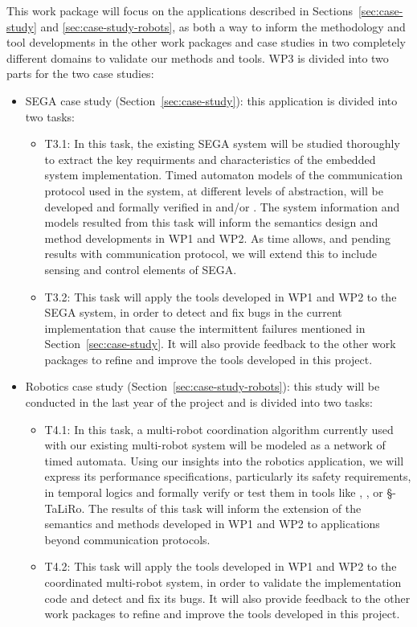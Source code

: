 This work package will focus on the applications described in Sections~\ref{sec:case-study} and \ref{sec:case-study-robots}, as both a way to inform the methodology and tool developments in the other work packages and case studies in two completely different domains to validate our methods and tools.
WP3 is divided into two parts for the two case studies:
\begin{itemize}[labelsep=3pt,leftmargin=12pt]
\item SEGA case study (Section~\ref{sec:case-study}): this application is divided into two tasks:
  \begin{itemize}
  \item T3.1: In this task, the existing SEGA system will be
    studied thoroughly to extract the key requirments and
    characteristics of the embedded system implementation.  Timed
    automaton models of the communication protocol used in the system,
    at different levels of abstraction, will be developed and formally
    verified in \uppaal and/or \prism. The system information and models
    resulted from this task will inform the semantics design and method
    developments in WP1 and WP2. As time allows, and pending results
    with communication protocol, we will extend this to include sensing
    and control elements of SEGA.
  \item T3.2: This task will apply the tools developed in WP1 and WP2 to the SEGA system, in order to detect and fix bugs in the current implementation that cause the intermittent failures mentioned in Section~\ref{sec:case-study}.  It will also provide feedback to the other work packages to refine and improve the tools developed in this project.
  \end{itemize}

\item Robotics case study (Section~\ref{sec:case-study-robots}): this study will be conducted in the last year of the project and is divided into two tasks:
  \begin{itemize}
  \item T4.1: In this task, a multi-robot coordination algorithm currently used with our existing multi-robot system will be modeled as a network of timed automata.  Using our insights into the robotics application, we will express its performance specifications, particularly its safety requirements, in temporal logics and formally verify or test them in tools like \uppaal, \prism, or \S-TaLiRo.  The results of this task will inform the extension of the semantics and methods developed in WP1 and WP2 to applications beyond communication protocols.
  \item T4.2: This task will apply the tools developed in WP1 and WP2 to the coordinated multi-robot system, in order to validate the implementation code and detect and fix its bugs.  It will also provide feedback to the other work packages to refine and improve the tools developed in this project.
  \end{itemize}
\end{itemize}

